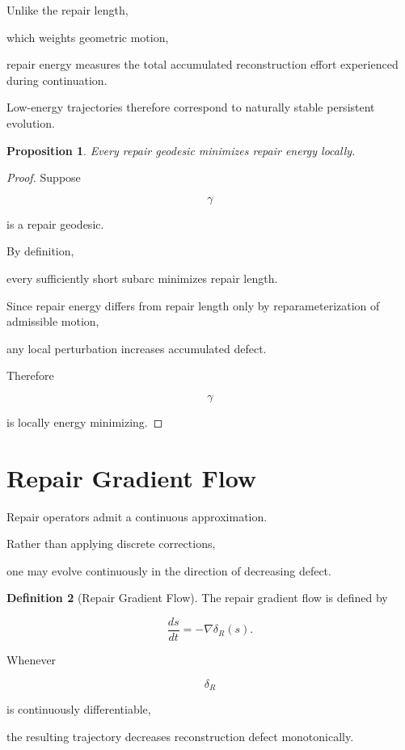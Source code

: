 \documentclass[11pt]{book}
\numberwithin{equation}{chapter}
\theoremstyle{definition}
\newtheorem{definition}{Definition}[chapter]
\theoremstyle{plain}
\newtheorem{proposition}[definition]{Proposition}
\begin{document}
Unlike the repair length,

which weights geometric motion,

repair energy measures the total accumulated reconstruction effort
experienced during continuation.

Low-energy trajectories therefore correspond to naturally stable
persistent evolution.

\begin{proposition}

Every repair geodesic minimizes repair energy locally.

\end{proposition}

\begin{proof}

Suppose

\[
\gamma
\]

is a repair geodesic.

By definition,

every sufficiently short subarc minimizes repair length.

Since repair energy differs from repair length only by
reparameterization of admissible motion,

any local perturbation increases accumulated defect.

Therefore

\[
\gamma
\]

is locally energy minimizing.

\end{proof}

\section{Repair Gradient Flow}

Repair operators admit a continuous approximation.

Rather than applying discrete corrections,

one may evolve continuously in the direction of decreasing defect.

\begin{definition}[Repair Gradient Flow]

The repair gradient flow is defined by

\[
\frac{ds}{dt}
=
-
\nabla
\delta_R(s).
\]

Whenever

\[
\delta_R
\]

is continuously differentiable,

the resulting trajectory decreases reconstruction defect
monotonically.

\end{definition}
\end{document}

